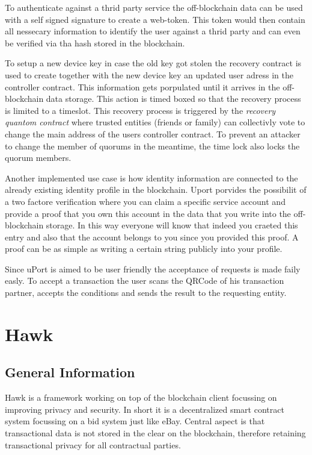 To authenticate against a thrid party service the off-blockchain data can be used with a self signed signature to create a web-token. This token would then contain all nessecary information to identify the user against a thrid party and can even be verified via tha hash stored in the blockchain.

To setup a new device key in case the old key got stolen the recovery contract is used to create together with the new device key an updated user adress in the controller contract. This information gets porpulated until it arrives in the off-blockchain data storage. This action is timed boxed so that the recovery process is limited to a timeslot. This recovery process is triggered by the \textit{recovery quantom contract} where trusted entities (friends or family) can collectivly vote to change the main address of the users controller contract. To prevent an attacker to change the member of quorums in the meantime, the time lock also locks the quorum members.

Another implemented use case is how identity information are connected to the already existing identity profile in the blockchain. Uport porvides the possibilit of a two factore verification where you can claim a specific service account and provide a proof that you own this account in the data that you write into the off-blockchain storage. In this way everyone will know that indeed you craeted this entry and also that the account belongs to you since you provided this proof. A proof can be as simple as writing a certain string publicly into your profile. 

Since uPort is aimed to be user friendly the acceptance of requests is made faily easly. To accept a transaction the user scans the QRCode of his transaction partner, accepts the conditions and sends the result to the requesting entity.



\section{Hawk}
\subsection{General Information}
Hawk is a framework working on top of the blockchain client focussing on improving privacy and security. In short it is a decentralized smart contract system focussing on a bid system just like eBay. Central aspect is that transactional data is not stored in the clear on the blockchain, therefore retaining transactional privacy for all contractual parties.

